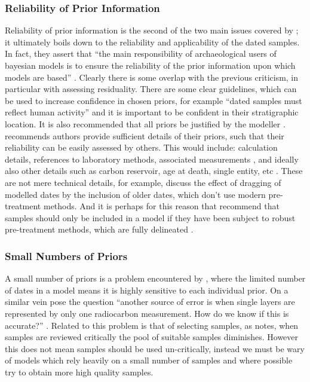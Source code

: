 \subsubsection{Reliability of Prior Information}
Reliability of prior information is the second of the two main issues covered by \citet{doi:10.1080/00438243.2015.1070082}; it ultimately boils down to the reliability and applicability of the dated samples. In fact, they assert that ``the main responsibility of archaeological users of bayesian models is to ensure the reliability of the prior information upon which models are based'' \citep[527]{doi:10.1080/00438243.2015.1070082}. Clearly there is some overlap with the previous criticism, in particular with assessing residuality. There are some clear guidelines, which can be used to increase confidence in chosen priors, for example ``dated samples must reflect human activity'' \citep[532]{doi:10.1080/00438243.2015.1070082} and it is important to be confident in their stratigraphic location. It is also recommended that all priors be justified by the modeller \citep[537]{doi:10.1080/00438243.2015.1070082}. \citet{doi:10.1080/00438243.2015.1067640} recommends authors provide sufficient details of their priors, such that their reliability can be easily assessed by others. This would include: calculation details, references to laboratory methods, associated measurements \citep[687]{doi:10.1080/00438243.2015.1067640}, and ideally also other details such as carbon reservoir, age at death, single entity, etc \citep[690]{doi:10.1080/00438243.2015.1067640}. These are not mere technical details, for example, \citet[610]{doi:10.1080/00438243.2015.1065759} discuss the effect of dragging of modelled dates by the inclusion of older dates, which don't use modern pre-treatment methods. And it is perhaps for this reason that \citet{doi:10.1080/00438243.2015.1070082} recommend that samples should only be included in a model if they have been subject to robust pre-treatment methods, which are fully delineated \citep[537]{doi:10.1080/00438243.2015.1070082}.

\subsubsection{Small Numbers of Priors}
A small number of priors is a problem encountered by \citet[604]{doi:10.1080/00438243.2015.1065759}, where the limited number of dates in a model means it is highly sensitive to each individual prior. On a similar vein \citet{doi:10.1080/00438243.2015.1070082} pose the question ``another source of error is when single layers are represented by only one radiocarbon measurement. How do we know if this is accurate?'' \citep[530]{doi:10.1080/00438243.2015.1070082}. Related to this problem is that of selecting samples, as \citet{doi:10.1080/00438243.2015.1070082} notes, when samples are reviewed critically the pool of suitable samples diminishes. However this does not mean samples should be used un-critically, instead we must be wary of models which rely heavily on a small number of samples and where possible try to obtain more high quality samples.


